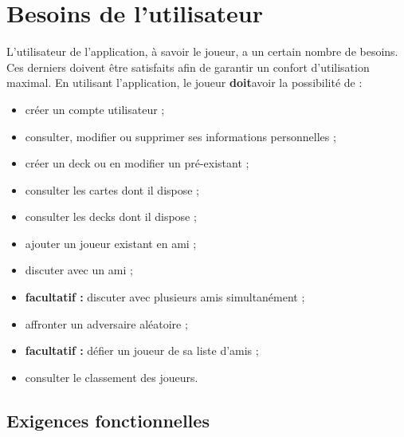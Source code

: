 \documentclass[12pt]{article}
\let\simplesection\section
\renewcommand{\section}{\clearpage\simplesection}
\let\simplesubsection\subsection
\renewcommand{\subsection}{
	\needspace{0.5\pagetotal}
	\simplesubsection
}
\newcommand{\doit}{\textbf{doit}}
\newcommand{\faclt}{\textbf{\gls{facultatif} : }}
\begin{document}
\section{Besoins de l'utilisateur}
	L'utilisateur de l'application, à savoir le joueur, a un certain nombre de besoins. Ces derniers doivent être satisfaits afin de garantir un confort d'utilisation
	maximal. En utilisant l'application, le joueur \doit avoir la possibilité de :

	\begin{itemize}
		\item créer un compte utilisateur ;
		\item consulter, modifier ou supprimer ses informations personnelles ; 
		\item créer un \gls{deck} ou en modifier un pré-existant ;
		\item consulter les cartes dont il dispose ;
		\item consulter les \glspl{deck} dont il dispose ;
		\item ajouter un joueur existant en ami ;
		\item discuter avec un ami ;
		\item \faclt discuter avec plusieurs amis simultanément ;
		\item affronter un adversaire aléatoire ;
		\item \faclt défier un joueur de sa liste d'amis ;
		\item consulter le classement des joueurs.
	\end{itemize}

	\subsection{Exigences fonctionnelles}
\end{document}
